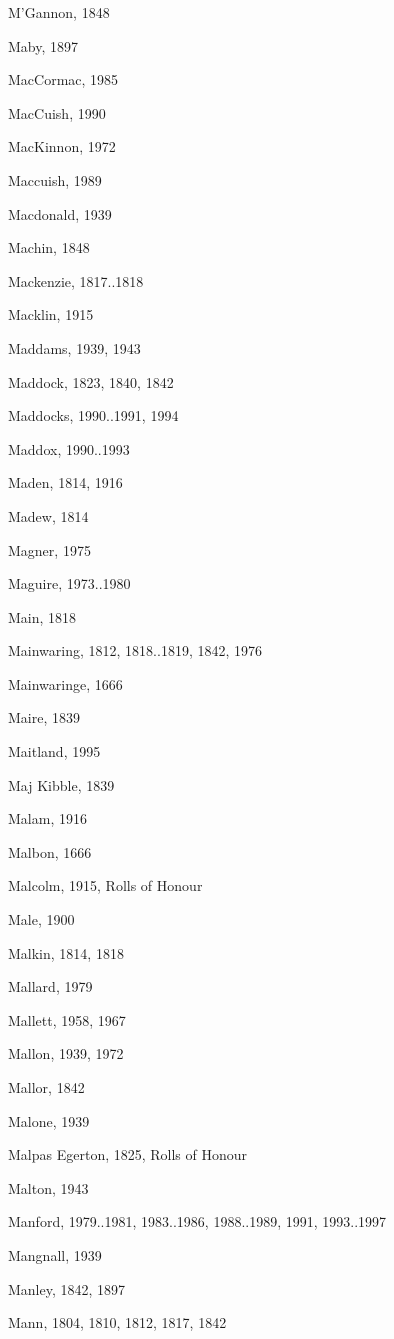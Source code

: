 \begin{theindex}
\item M'Gannon, 1848
\item Maby, 1897
\item MacCormac, 1985
\item MacCuish, 1990
\item MacKinnon, 1972
\item Maccuish, 1989
\item Macdonald, 1939
\item Machin, 1848
\item Mackenzie, 1817..1818
\item Macklin, 1915
\item Maddams, 1939, 1943
\item Maddock, 1823, 1840, 1842
\item Maddocks, 1990..1991, 1994
\item Maddox, 1990..1993
\item Maden, 1814, 1916
\item Madew, 1814
\item Magner, 1975
\item Maguire, 1973..1980
\item Main, 1818
\item Mainwaring, 1812, 1818..1819, 1842, 1976
\item Mainwaringe, 1666
\item Maire, 1839
\item Maitland, 1995
\item Maj Kibble, 1839
\item Malam, 1916
\item Malbon, 1666
\item Malcolm, 1915, Rolls of Honour
\item Male, 1900
\item Malkin, 1814, 1818
\item Mallard, 1979
\item Mallett, 1958, 1967
\item Mallon, 1939, 1972
\item Mallor, 1842
\item Malone, 1939
\item Malpas Egerton, 1825, Rolls of Honour
\item Malton, 1943
\item Manford, 1979..1981, 1983..1986, 1988..1989, 1991, 1993..1997
\item Mangnall, 1939
\item Manley, 1842, 1897
\item Mann, 1804, 1810, 1812, 1817, 1842

\end{theindex}
